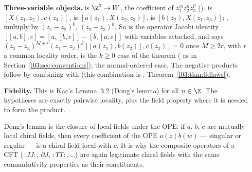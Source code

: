 \begin{dictionary}
\textbf{Three-variable objects.}  is $\Z^3\to W$, the coefficient of
$z_1^mz_2^nz_3^p$ ().
 is $[X(z_1,z_2),c(z_3)]$,  is $[a(z_1),X(z_2,z_3)]$,
 is $[b(z_2),X(z_1,z_3)]$; ,  multiply
by $(z_1-z_2)^k$, $(z_2-z_3)^k$. So  is the operator Jacobi identity
$[[a,b],c] = [a,[b,c]] - [b,[a,c]]$ with variables attached, and  says
$(z_2-z_3)^{M+r}(z_1-z_2)^k[[a(z_1),b(z_2)],c(z_3)] = 0$ once $M\ge2r$, with $r$ a common locality
order.  is the $k\ge0$ case of the theorem ( as in
Section~\ref{l03:sec:conventions});  the normal-ordered case. The negative products
follow by combining  with  (this combination is
, Theorem~\ref{l03:thm:fldlaws}).

\textbf{Fidelity.} This is Kac's Lemma~3.2 (Dong's lemma) for all $n\in\Z$. The hypotheses are
exactly pairwise locality, plus the field property where it is needed to form the product.
\end{dictionary}

\begin{physics}
Dong's lemma is the closure of local fields under the OPE: if $a$, $b$, $c$ are mutually local
chiral fields, then every coefficient of the OPE $a(z)b(w)$ --- singular or regular --- is a chiral
field local with $c$. It is why the composite operators of a CFT (${:}JJ{:}$, $\partial J$,
${:}TT{:}$, \dots) are again legitimate chiral fields with the same commutativity properties as their
constituents.
\end{physics}


